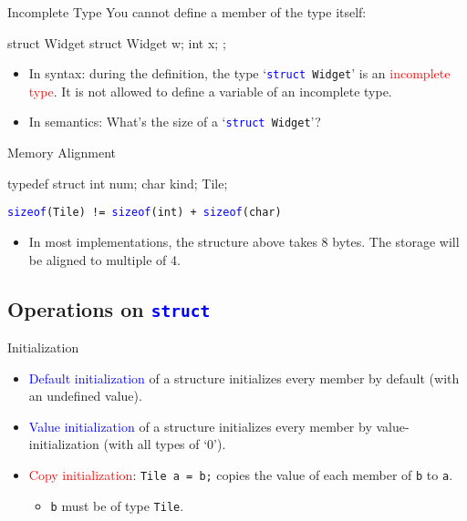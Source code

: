 \documentclass{beamer}
\newcommand{\red}[1]{\textcolor{red}{#1}}
\newcommand{\blue}[1]{\textcolor{blue}{#1}}
\newcommand{\ttt}[1]{\texttt{#1}}
\newcommand{\bluett}[1]{\blue{\ttt{#1}}}
\theoremstyle{definition}
\begin{document}
\begin{frame}[fragile]{Incomplete Type}
    You cannot define a member of the type itself:
    \begin{cpp}
struct Widget {
  struct Widget w;
  int x;
};
    \end{cpp}
    \begin{itemize}
        \item In syntax: during the definition, the type `\bluett{struct }\ttt{Widget}' is an \red{incomplete type}. It is not allowed to define a variable of an incomplete type.
        \item In semantics: What's the size of a `\bluett{struct }\ttt{Widget}'?
    \end{itemize}
\end{frame}

\begin{frame}[fragile]{Memory Alignment}
    \begin{cpp}
typedef struct {
  int num;
  char kind;
} Tile;
    \end{cpp}
    \bluett{sizeof}\ttt{(Tile) != }\bluett{sizeof}\ttt{(int) + }\bluett{sizeof}\ttt{(char)}
    \begin{itemize}
        \item In most implementations, the structure above takes 8 bytes. The storage will be aligned to multiple of 4.
    \end{itemize}
\end{frame}

\subsection{Operations on \bluett{struct}}

\begin{frame}[fragile]{Initialization}
    \begin{itemize}
        \item \blue{Default initialization} of a structure initializes every member by default (with an undefined value).
        \item \blue{Value initialization} of a structure initializes every member by value-initialization (with all types of `0').
        \pause
        \item \red{Copy initialization}: \ttt{Tile a = b;} copies the value of each member of \ttt{b} to \ttt{a}.
        \begin{itemize}
            \item \ttt{b} must be of type \ttt{Tile}.
        \end{itemize}
    \end{itemize}
\end{frame}
\end{document}

